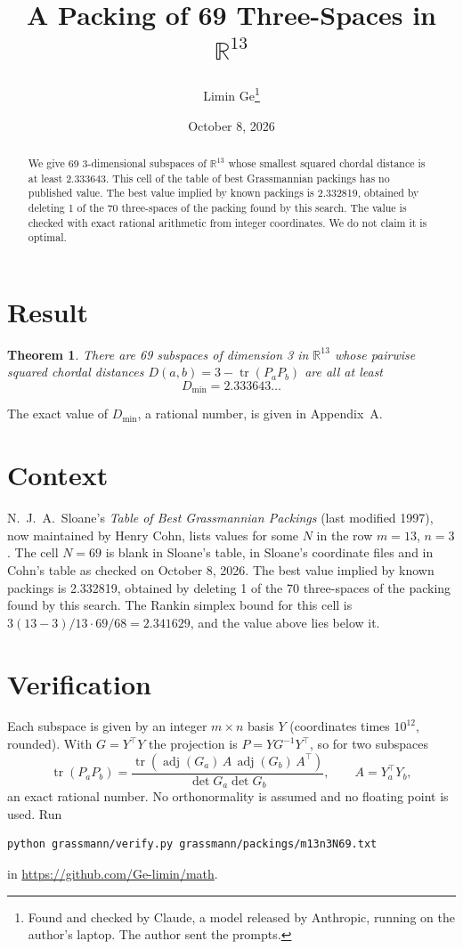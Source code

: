 \documentclass[11pt,a4paper]{article}
\title{A Packing of 69 Three-Spaces in $\mathbb{R}^{13}$}
\author{Limin Ge\thanks{Found and checked by Claude, a model released by Anthropic, running on the author's laptop. The author sent the prompts.}}
\date{October 8, 2026}
\newtheorem*{theorem}{Theorem}
\begin{document}
\maketitle
\begin{abstract}
We give 69 3-dimensional subspaces of $\mathbb{R}^{13}$ whose smallest squared chordal distance is at least 2.333643. This cell of the table of best Grassmannian packings has no published value. The best value implied by known packings is 2.332819, obtained by deleting 1 of the 70 three-spaces of the packing found by this search. The value is checked with exact rational arithmetic from integer coordinates. We do not claim it is optimal.
\end{abstract}

\section{Result}
\begin{theorem}
There are 69 subspaces of dimension 3 in $\mathbb{R}^{13}$ whose pairwise squared chordal distances $D(a,b) = 3 - \operatorname{tr}(P_aP_b)$ are all at least
\[ D_{\min} = 2.333643\ldots \]
\end{theorem}
The exact value of $D_{\min}$, a rational number, is given in Appendix~A.


\section{Context}
N.~J.~A.~Sloane's \emph{Table of Best Grassmannian Packings} (last modified 1997), now maintained by Henry Cohn, lists values for some $N$ in the row $m=13$, $n=3$. The cell $N=69$ is blank in Sloane's table, in Sloane's coordinate files and in Cohn's table as checked on October 8, 2026. The best value implied by known packings is 2.332819, obtained by deleting 1 of the 70 three-spaces of the packing found by this search. The Rankin simplex bound for this cell is $3(13-3)/13\cdot 69/68 = 2.341629$, and the value above lies below it.


\section{Verification}
Each subspace is given by an integer $m\times n$ basis $Y$ (coordinates times $10^{12}$, rounded). With $G=Y^\top Y$ the projection is $P=YG^{-1}Y^\top$, so for two subspaces
\[ \operatorname{tr}(P_aP_b)=\frac{\operatorname{tr}(\operatorname{adj}(G_a)\,A\,\operatorname{adj}(G_b)\,A^\top)}{\det G_a\det G_b},\qquad A=Y_a^\top Y_b, \]
an exact rational number. No orthonormality is assumed and no floating point is used. Run
\begin{verbatim}
python grassmann/verify.py grassmann/packings/m13n3N69.txt
\end{verbatim}
in \url{https://github.com/Ge-limin/math}.
\end{document}
